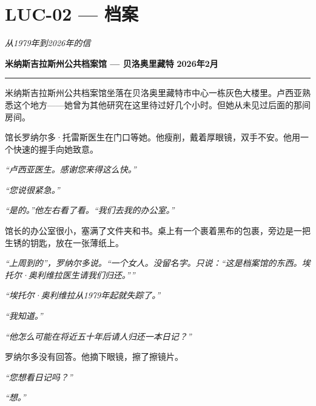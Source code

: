 \section*{\textbf{LUC-02} --- 档案}

\noindent \textit{从1979年到2026年的信}

\noindent \textbf{米纳斯吉拉斯州公共档案馆 --- 贝洛奥里藏特}
\noindent \textbf{2026年2月}

\vspace{0.5em}\noindent\rule{\textwidth}{0.5pt}\vspace{0.5em}

\noindent 米纳斯吉拉斯州公共档案馆坐落在贝洛奥里藏特市中心一栋灰色大楼里。卢西亚熟悉这个地方——她曾为其他研究在这里待过好几个小时。但她从未见过后面的那间房间。

\noindent 馆长罗纳尔多·托雷斯医生在门口等她。他瘦削，戴着厚眼镜，双手不安。他用一个快速的握手向她致意。

\noindent \textit{\textquotedblleft{}卢西亚医生。感谢您来得这么快。\textquotedblright{}}

\noindent \textit{\textquotedblleft{}您说很紧急。\textquotedblright{}}

\noindent \textit{\textquotedblleft{}是的。\textquotedblright{}他左右看了看。\textquotedblleft{}我们去我的办公室。\textquotedblright{}}

\noindent 馆长的办公室很小，塞满了文件夹和书。桌上有一个裹着黑布的包裹，旁边是一把生锈的钥匙，放在一张薄纸上。

\noindent \textit{\textquotedblleft{}上周到的\textquotedblright{}，罗纳尔多说。\textquotedblleft{}一个女人。没留名字。只说：\textquotedblleft{}这是档案馆的东西。埃托尔·奥利维拉医生请我们归还。\textquotedblright{}\textquotedblright{}}

\noindent \textit{\textquotedblleft{}埃托尔·奥利维拉从1979年起就失踪了。\textquotedblright{}}

\noindent \textit{\textquotedblleft{}我知道。\textquotedblright{}}

\noindent \textit{\textquotedblleft{}他怎么可能在将近五十年后请人归还一本日记？\textquotedblright{}}

\noindent 罗纳尔多没有回答。他摘下眼镜，擦了擦镜片。

\noindent \textit{\textquotedblleft{}您想看日记吗？\textquotedblright{}}

\noindent \textit{\textquotedblleft{}想。\textquotedblright{}}

